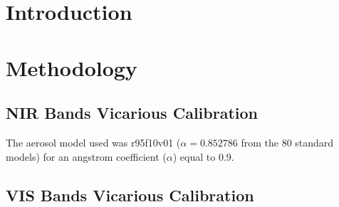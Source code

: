 \documentclass[onecolumn,3p,letterpaper,11pt]{elsarticle}
\begin{document}
\section{Introduction}

\section{Methodology}
\subsection{NIR Bands Vicarious Calibration}
The aerosol model used was r95f10v01 ($\alpha=0.852786$ from the 80 standard models) for an angstrom coefficient ($\alpha$) equal to 0.9.

\subsection{VIS Bands Vicarious Calibration}





\end{document}
